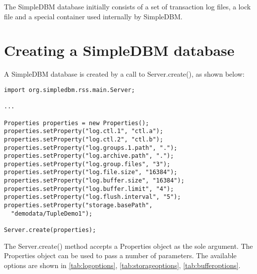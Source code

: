 \documentclass[a4paper,draft,oneside]{book}
\begin{document}
The SimpleDBM database initially consists of a set of transaction log
files, a lock file and a special container used internally by
SimpleDBM.

\section{Creating a SimpleDBM database}

A SimpleDBM database is created by a call to Server.create(), as shown
below:

\begin{verbatim}
import org.simpledbm.rss.main.Server;

...

Properties properties = new Properties();
properties.setProperty("log.ctl.1", "ctl.a");
properties.setProperty("log.ctl.2", "ctl.b");
properties.setProperty("log.groups.1.path", ".");
properties.setProperty("log.archive.path", ".");
properties.setProperty("log.group.files", "3");
properties.setProperty("log.file.size", "16384");
properties.setProperty("log.buffer.size", "16384");
properties.setProperty("log.buffer.limit", "4");
properties.setProperty("log.flush.interval", "5");
properties.setProperty("storage.basePath", 
  "demodata/TupleDemo1");

Server.create(properties);
\end{verbatim}

The Server.create() method accepts a Properties object as
the sole argument. The Properties object can be used to pass a
number of parameters. The available options are shown in
\ref{tab:logoptions}, \ref{tab:storageoptions}, \ref{tab:bufferoptions}. 
\end{document}
